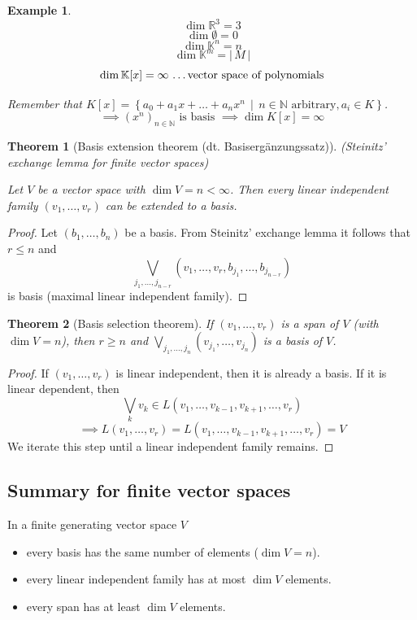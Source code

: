 \documentclass[a4paper,landscape,twocolumn]{article}
\newcommand\setdef[2]{\left\{#1\,\middle|\,#2\right\}}
\newcommand\card[1]{\left|\,#1\,\right|}
\newtheorem{theorem}{Theorem}[section]
\newtheorem{ex}{Example}[section]
\begin{document}
\begin{ex}
  \[ \dim{\mathbb R^3} = 3 \]
  \[ \dim{\emptyset} = 0 \]
  \[ \dim{\mathbb K^n} = n \]
  \[ \dim{\mathbb K^m} = \card{M} \]
  \[ \dim{\mathbb K[x]} = \infty \text{ \dots vector space of polynomials} \]

  Remember that $K[x] = \setdef{a_0 + a_1 x + \dots + a_n x^n}{n \in \mathbb N \text{ arbitrary}, a_i \in K}$.
  \[ \implies (x^n)_{n \in \mathbb N} \text{ is basis } \implies \dim{K[x]} = \infty \]
\end{ex}

\begin{theorem}[Basis extension theorem (dt. \foreignlanguage{ngerman}{Basisergänzungssatz})]
  \label{basis-extension}
  (Steinitz' exchange lemma for finite vector spaces)

  Let $V$ be a vector space with $\dim{V} = n < \infty$.
  Then every linear independent family $(v_1, \dots, v_r)$ can be extended to a basis.
\end{theorem}

\begin{proof}
  Let $(b_1, \dots, b_n)$ be a basis.
  From Steinitz' exchange lemma it follows that $r \leq n$ and
  \[ \bigvee_{j_1, \dots, j_{n-r}} (v_1, \dots, v_r, b_{j_1}, \dots, b_{j_{n-r}}) \]
  is basis (maximal linear independent family).
\end{proof}

\begin{theorem}[Basis selection theorem]
  If $(v_1, \dots, v_r)$ is a span of $V$ (with $\dim{V} = n$),
  then $r \geq n$ and $\bigvee_{j_1, \dots, j_n} (v_{j_1}, \dots, v_{j_n})$ is a basis of $V$.
\end{theorem}

\begin{proof}
  If $(v_1, \dots, v_r)$ is linear independent, then it is already a basis.
  If it is linear dependent, then
  \[ \bigvee_{k} v_k \in L(v_1, \dots, v_{k-1}, v_{k+1}, \dots, v_r) \]
  \[ \implies L(v_1, \dots, v_r) = L(v_1, \dots, v_{k-1}, v_{k+1}, \dots, v_r) = V \]
  We iterate this step until a linear independent family remains.
\end{proof}

\subsection{Summary for finite vector spaces}
In a finite generating vector space $V$
\begin{itemize}
  \item every basis has the same number of elements ($\dim{V} = n$).
  \item every linear independent family has at most $\dim{V}$ elements.
  \item every span has at least $\dim{V}$ elements.
\end{itemize}
\end{document}
